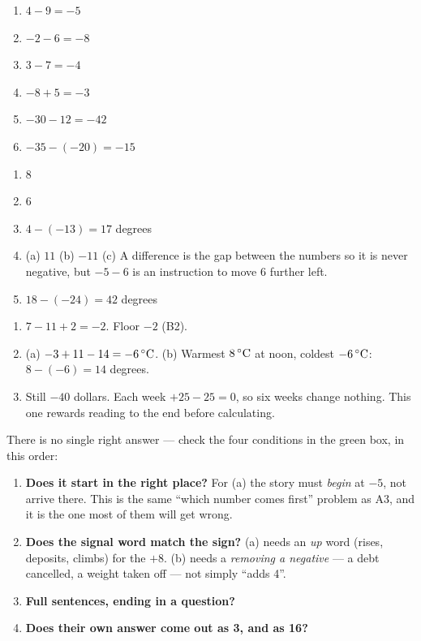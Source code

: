 \documentclass[12pt,a4paper]{article}
\begin{document}
\begin{enumerate}[label=\arabic*., itemsep=3pt]
  \item $4-9=-5$
  \item $-2-6=-8$
  \item $3-7=-4$
  \item $-8+5=-3$
  \item $-30-12=-42$
  \item $-35-(-20)=-15$
\end{enumerate}

\begin{enumerate}[label=\arabic*., itemsep=3pt]
  \item $8$
  \item $6$
  \item $4-(-13)=17$ degrees
  \item (a) $11$ \; (b) $-11$ \; (c) A difference is the gap between the numbers so it
        is never negative, but $-5-6$ is an instruction to move 6 further left.
  \item $18-(-24)=42$ degrees
\end{enumerate}

\begin{enumerate}[label=\arabic*., itemsep=3pt]
  \item $7-11+2=-2$. Floor $-2$ (B2).
  \item (a) $-3+11-14=-6\,^{\circ}\mathrm{C}$. \; (b) Warmest $8\,^{\circ}\mathrm{C}$ at noon, coldest $-6\,^{\circ}\mathrm{C}$:
        $8-(-6)=14$ degrees.
  \item Still $-40$ dollars. Each week $+25-25=0$, so six weeks change nothing. This one
        rewards reading to the end before calculating.
\end{enumerate}

\noindent There is no single right answer --- check the four conditions in the green
box, in this order:
\begin{enumerate}[label=\arabic*., itemsep=3pt]
  \item \textbf{Does it start in the right place?} For (a) the story must \emph{begin}
        at $-5$, not arrive there. This is the same ``which number comes first''
        problem as A3, and it is the one most of them will get wrong.
  \item \textbf{Does the signal word match the sign?} (a) needs an \emph{up} word
        (rises, deposits, climbs) for the $+8$. (b) needs a \emph{removing a negative}
        --- a debt cancelled, a weight taken off --- not simply ``adds 4''.
  \item \textbf{Full sentences, ending in a question?}
  \item \textbf{Does their own answer come out as 3, and as 16?}
\end{enumerate}
\end{document}
